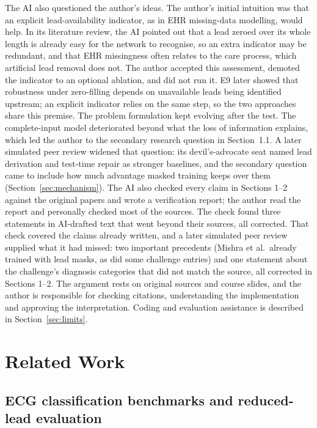 The AI also questioned the author's ideas. The author's initial intuition was that an explicit lead-availability indicator, as in EHR missing-data modelling, would help. In its literature review, the AI pointed out that a lead zeroed over its whole length is already easy for the network to recognise, so an extra indicator may be redundant, and that EHR missingness often relates to the care process, which artificial lead removal does not. The author accepted this assessment, demoted the indicator to an optional ablation, and did not run it. E9 later showed that robustness under zero-filling depends on unavailable leads being identified upstream; an explicit indicator relies on the same step, so the two approaches share this premise. The problem formulation kept evolving after the test. The complete-input model deteriorated beyond what the loss of information explains, which led the author to the secondary research question in Section~1.1. A later simulated peer review widened that question: its devil's-advocate seat named lead derivation and test-time repair as stronger baselines, and the secondary question came to include how much advantage masked training keeps over them (Section~\ref{sec:mechanism}). The AI also checked every claim in Sections 1--2 against the original papers and wrote a verification report; the author read the report and personally checked most of the sources. The check found three statements in AI-drafted text that went beyond their sources, all corrected. That check covered the claims already written, and a later simulated peer review supplied what it had missed: two important precedents (Mishra et al.\ already trained with lead masks, as did some challenge entries) and one statement about the challenge's diagnosis categories that did not match the source, all corrected in Sections 1--2. The argument rests on original sources and course slides, and the author is responsible for checking citations, understanding the implementation and approving the interpretation. Coding and evaluation assistance is described in Section~\ref{sec:limits}.

\section{Related Work}

\subsection{ECG classification benchmarks and reduced-lead evaluation}

